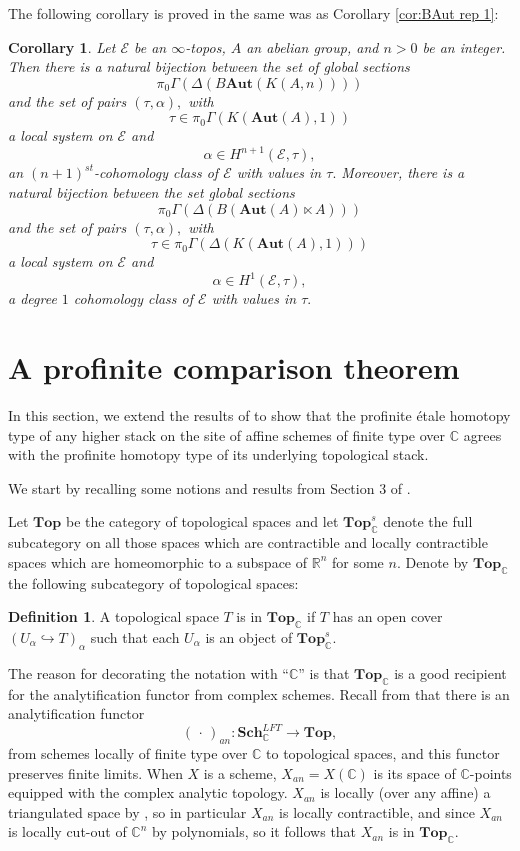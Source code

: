 \documentclass[12pt]{amsart}
\newtheorem{corollary}[dummy]{Corollary}
\theoremstyle{definition}
\newtheorem{definition}[dummy]{Definition}
\newcommand{\bC}{\mathbb{C}}
\newcommand{\cE}{\mathcal{E}}
\newcommand{\TopC}{\Top_\mathbb{C}}
\newcommand{\TopCs}{\TopC^s}
\def\Top{\mathbf{Top}}
\def\Sch{\mathbf{Sch}}
\renewcommand{\i}{\infty}
\def\blank{\mspace{3mu}\cdot\mspace{3mu}}
\def\Top{\mathbf{Top}}
\def\Aut{\mathbf{Aut}}
\begin{document}
The following corollary is proved in the same was as Corollary \ref{cor:BAut rep 1}:

\begin{corollary}\label{cor:BAut rep 2}
Let $\cE$ be an $\i$-topos, $A$ an abelian group, and $n>0$ be an integer. Then there is a natural bijection between the set of global sections
$$\pi_0\Gamma\left(\Delta\left(B\Aut\left(K\left(A,n\right)\right)\right)\right)$$
and the set of pairs $\left(\tau,\alpha\right),$ with $$\tau \in \pi_0\Gamma\left(K\left(\Aut\left(A\right),1\right)\right)$$ a local system on $\cE$ and $$\alpha \in H^{n+1}\left(\cE,\tau\right),$$ an $\left(n+1\right)^{st}$-cohomology class of $\cE$ with values in $\tau.$ Moreover, there is a natural bijection between the set global sections $$\pi_0\Gamma\left(\Delta\left(B\left(\Aut\left(A\right) \ltimes A\right)\right)\right)$$ and the set of pairs $\left(\tau,\alpha\right),$ with $$\tau\in \pi_0\Gamma\left(\Delta\left(K\left(\Aut\left(A\right),1\right)\right)\right)$$ a local system on $\cE$ and $$\alpha \in H^{1}\left(\cE,\tau\right),$$ a degree $1$ cohomology class of $\cE$ with values in $\tau.$
\end{corollary}


\section{A profinite comparison theorem}
In this section, we  extend the results of \cite{ArtinMazur} to show that the profinite \'etale homotopy type of any higher stack on the site of affine schemes of finite type over $\mathbb{C}$ agrees with the profinite homotopy type of its underlying topological stack.

We start by recalling some notions and results from Section 3 of \cite{knhom}.

Let $\Top$ be the category of topological spaces and let $\TopCs$ denote the full subcategory on all those spaces which are contractible and locally contractible spaces which are homeomorphic to a subspace of $\mathbb{R}^n$ for some $n.$ Denote by $\TopC$ the following subcategory of topological spaces:

\begin{definition}
A topological space $T$ is in $\TopC$ if $T$ has an open cover $\left(U_\alpha \hookrightarrow T\right)_\alpha$ such that each $U_\alpha$ is an object of $\TopCs.$
\end{definition}

The reason for decorating the notation with ``$\mathbb{C}$'' is that $\TopC$ is a good recipient for the analytification functor from complex schemes. Recall from \cite{toen-vaquie} that there is an analytification functor
$$\left(\blank\right)_{an}:\Sch^{LFT}_\bC \to \Top,$$
from schemes locally of finite type over $\bC$ to topological spaces, and this functor preserves finite limits. When $X$ is a scheme, $X_{an}=X\left(\bC\right)$ is its space of $\bC$-points equipped with the complex analytic topology. $X_{an}$ is locally (over any affine) a triangulated space by \cite{Lo}, so in particular $X_{an}$ is locally contractible, and since $X_{an}$ is locally cut-out of $\mathbb{C}^n$ by polynomials, so it follows that $X_{an}$ is in $\TopC.$
\end{document}
